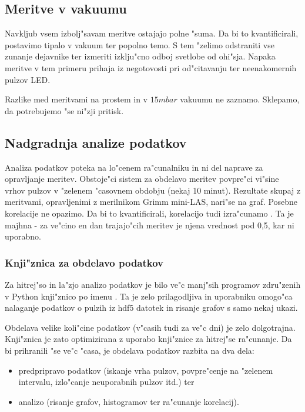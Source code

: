 \documentclass[11pt,a4paper]{article}
\begin{document}
\subsection{Meritve v vakuumu}
Navkljub vsem izbolj"savam meritve ostajajo polne "suma. Da bi to kvantificirali, postavimo tipalo v vakuum ter popolno temo. S tem "zelimo odstraniti vse zunanje dejavnike ter izmeriti izklju"cno odboj svetlobe od ohi"sja. Napaka meritve v tem primeru prihaja iz negotovosti pri od"citavanju ter neenakomernih pulzov LED.

Razlike med meritvami na prostem in v $ 15mbar $ vakuumu ne zaznamo. Sklepamo, da potrebujemo "se ni"zji pritisk.


\subsection{Nadgradnja analize podatkov}
Analiza podatkov poteka na lo"cenem ra"cunalniku in ni del naprave za opravljanje meritev. Obstoje"ci sistem za obdelavo meritev povpre"ci vi"sine vrhov pulzov v "zelenem "casovnem obdobju (nekaj 10 minut). Rezultate skupaj z meritvami, opravljenimi z merilnikom Grimm mini-LAS, nari"se na graf. Posebne korelacije ne opazimo. Da bi to kvantificirali, korelacijo tudi izra"cunamo  . Ta je majhna - za ve"cino en dan trajajo"cih meritev je njena vrednost pod 0,5, kar ni uporabno.


\subsubsection{Knji"znica za obdelavo podatkov}
Za hitrej"so in la"zjo analizo podatkov je bilo ve"c manj"sih programov zdru"zenih v Python knji"znico po imenu . Ta je zelo prilagodljiva in uporabniku omogo"ca nalaganje podatkov o pulzih iz hdf5 \cite{hdf5} datotek in risanje grafov s samo nekaj ukazi.

Obdelava velike koli"cine podatkov (v"casih tudi za ve"c dni) je zelo dolgotrajna. Knji"znica  je zato optimizirana z uporabo knji"znice  za hitrej"se ra"cunanje. Da bi prihranili "se ve"c "casa, je obdelava podatkov razbita na dva dela:
\begin{itemize}
	\item predpripravo podatkov (iskanje vrha pulzov, povpre"cenje na "zelenem intervalu, izlo"canje neuporabnih pulzov itd.) ter
	\item analizo (risanje grafov, histogramov ter ra"cunanje korelacij).
\end{itemize}
\end{document}
